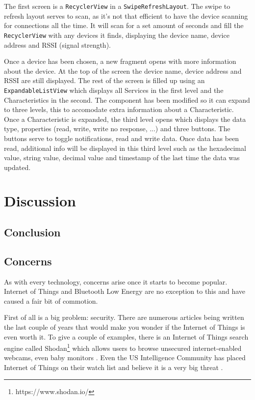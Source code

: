 \documentclass[pdftex,a4paper,12pt,twoside]{report}
\begin{document}
The first screen is a \texttt{RecyclerView} in a \texttt{SwipeRefreshLayout}. The swipe to refresh layout serves to scan, as it's not that efficient to have the device scanning for connections all the time. It will scan for a set amount of seconds and fill the \texttt{RecyclerView} with any devices it finds, displaying the device name, device address and RSSI (signal strength).

Once a device has been chosen, a new fragment opens with more information about the device. At the top of the screen the device name, device address and RSSI are still displayed. The rest of the screen is filled up using an \texttt{ExpandableListView} which displays all Services in the first level and the Characteristics in the second. The component has been modified so it can expand to three levels, this to accomodate extra information about a Characteristic. Once a Characteristic is expanded, the third level opens which displays the data type, properties (read, write, write no response, ...) and three buttons. The buttons serve to toggle notifications, read and write data. Once data has been read, additional info will be displayed in this third level such as the hexadecimal value, string value, decimal value and timestamp of the last time the data was updated.

\chapter{Discussion}
\label{ch:discussion}

\section{Conclusion}
\label{sec:conclusion}

\section{Concerns}
\label{sec:concerns}

As with every technology, concerns arise once it starts to become popular. Internet of Things and Bluetooth Low Energy are no exception to this and have caused a fair bit of commotion.

First of all is a big problem: security. There are numerous articles being written the last couple of years that would make you wonder if the Internet of Things is even worth it. To give a couple of examples, there is an Internet of Things search engine called Shodan\footnote{https://www.shodan.io/} which allows users to browse unsecured internet-enabled webcams, even baby monitors \citep{porup20162, stanislav2015}. Even the US Intelligence Community has placed Internet of Things on their watch list and believe it is a very big threat \citep{clapper2016}.
\end{document}
